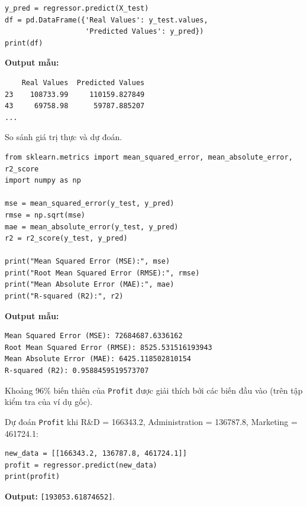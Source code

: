 \begin{vidu}[title={Bước 3: Kiểm thử}]
\begin{lstlisting}
y_pred = regressor.predict(X_test)
df = pd.DataFrame({'Real Values': y_test.values,
                   'Predicted Values': y_pred})
print(df)
\end{lstlisting}

\textbf{Output mẫu:}
\begin{verbatim}
    Real Values  Predicted Values
23    108733.99     110159.827849
43     69758.98      59787.885207
...
\end{verbatim}
So sánh giá trị thực và dự đoán.
\end{vidu}

\begin{vidu}[title={Bước 4: Đánh giá mô hình}]
\begin{lstlisting}
from sklearn.metrics import mean_squared_error, mean_absolute_error, r2_score
import numpy as np

mse = mean_squared_error(y_test, y_pred)
rmse = np.sqrt(mse)
mae = mean_absolute_error(y_test, y_pred)
r2 = r2_score(y_test, y_pred)

print("Mean Squared Error (MSE):", mse)
print("Root Mean Squared Error (RMSE):", rmse)
print("Mean Absolute Error (MAE):", mae)
print("R-squared (R2):", r2)
\end{lstlisting}

\textbf{Output mẫu:}
\begin{verbatim}
Mean Squared Error (MSE): 72684687.6336162
Root Mean Squared Error (RMSE): 8525.531516193943
Mean Absolute Error (MAE): 6425.118502810154
R-squared (R2): 0.9588459519573707
\end{verbatim}

\begin{ynghia}[title={Giải thích $R^2 \approx 0{,}96$}]
Khoảng 96\% biến thiên của \texttt{Profit} được giải thích bởi các biến đầu vào (trên tập kiểm tra của ví dụ gốc).
\end{ynghia}
\end{vidu}

\begin{vidu}[title={Bước 5: Dự đoán dữ liệu mới}]
Dự đoán \texttt{Profit} khi R\&D = 166343.2, Administration = 136787.8, Marketing = 461724.1:

\begin{lstlisting}
new_data = [[166343.2, 136787.8, 461724.1]]
profit = regressor.predict(new_data)
print(profit)
\end{lstlisting}

\textbf{Output:} \texttt{[193053.61874652]}.
\end{vidu}

